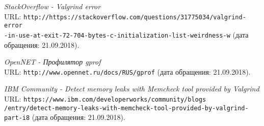\begin{thebibliography}{99}
{\itshape StackOverflow - Valgrind error} \\URL: \texttt{http://https://stackoverflow.com/questions/31775034/valgrind-error\\-in-use-at-exit-72-704-bytes-c-initialization-list-weirdness-w} (дата обращения: 21.09.2018). 

{\itshape OpenNET - Профилятор gprof} \\URL: \texttt{http://www.opennet.ru/docs/RUS/gprof} (дата обращения: 21.09.2018). 

{\itshape IBM Community - Detect memory leaks with Memcheck tool provided by Valgrind} \\URL: \texttt{https://www.ibm.com/developerworks/community/blogs\\/entry/detect-memory-leaks-with-memcheck-tool-provided-by-valgrind-part-i8} 
(дата обращения: 21.09.2018). 

\end{thebibliography}
\pagebreak

